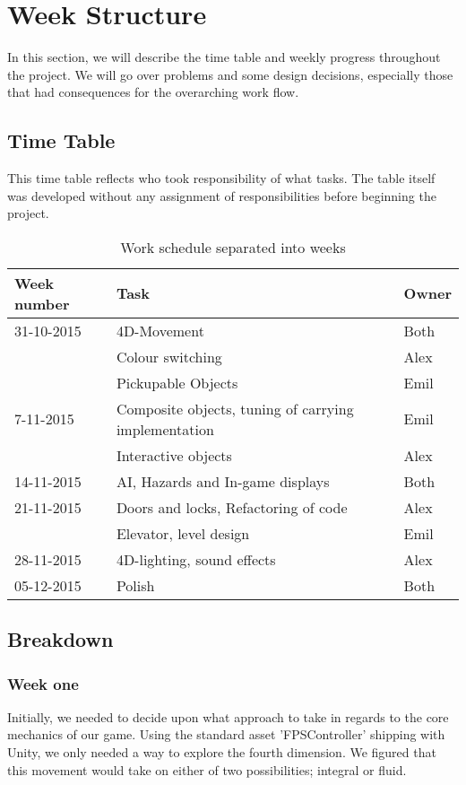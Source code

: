 \section{Week Structure}
In this section, we will describe the time table and weekly progress throughout the project. We will go over problems and some design decisions, especially those that had consequences for the overarching work flow.
\subsection{Time Table}
This time table reflects who took responsibility of what tasks. The table itself was developed without any assignment of responsibilities before beginning the project.
\begin{table}[h]
	\begin{tabular}{|l|l|l|}
		\hline
		Week number & Task & Owner\\
		\hline
		31-10-2015 & 4D-Movement & Both\\ 
		& Colour switching & Alex\\
		& Pickupable Objects & Emil\\
		\hline
		7-11-2015 & Composite objects, tuning of carrying implementation & Emil\\
		& Interactive objects & Alex\\
		\hline
		14-11-2015 & AI, Hazards and In-game displays & Both\\
		\hline
		21-11-2015 & Doors and locks, Refactoring of code & Alex\\
		& Elevator, level design & Emil\\
		\hline
		28-11-2015 & 4D-lighting, sound effects & Alex\\
		\hline
		05-12-2015 & Polish & Both\\
		\hline
	\end{tabular}
	\caption{Work schedule separated into weeks}
	\label{tabWeek}
\end{table}

\subsection{Breakdown}
\subsubsection{Week one}
Initially, we needed to decide upon what approach to take in regards to the core mechanics of our game. Using the standard asset 'FPSController' shipping with Unity, we only needed a way to explore the fourth dimension. We figured that this movement would take on either of two possibilities; integral or fluid.\\

